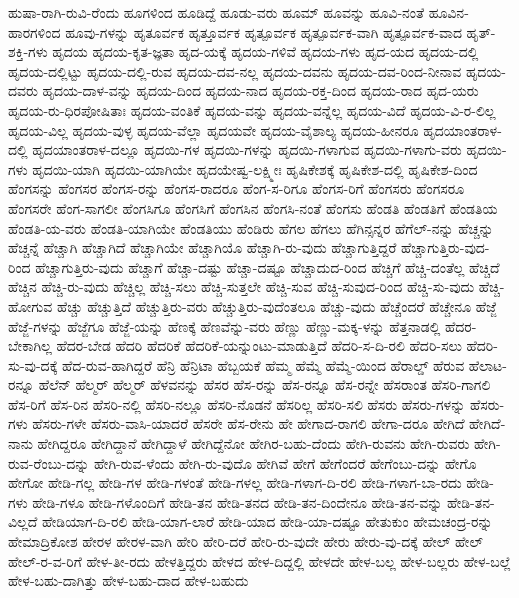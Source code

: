 {ಹುಷಾ-ರಾಗಿ-ರುವಿ-ರೆಂದು
ಹೂಗಳಿಂದ
ಹೂಡಿದ್ದೆ
ಹೂಡು-ವರು
ಹೂಮ್
ಹೂವನ್ನು
ಹೂವಿ-ನಂತೆ
ಹೂವಿನ-ಹಾರಗಳಿಂದ
ಹೂವು-ಗಳನ್ನು
ಹೃತೂರ್ವಕ
ಹೃತ್ತೂರ್ವಕ
ಹೃತ್ಪೂರ್ವಕ
ಹೃತ್ಪೂರ್ವಕ-ವಾಗಿ
ಹೃತ್ಪೂರ್ವಕ-ವಾದ
ಹೃತ್-ಶಕ್ತಿ-ಗಳು
ಹೃದಯ
ಹೃದಯ-ಕೃತ-ಜ್ಞತಾ
ಹೃದ-ಯಕ್ಕೆ
ಹೃದಯ-ಗಳಿವೆ
ಹೃದಯ-ಗಳು
ಹೃದ-ಯದ
ಹೃದಯ-ದಲ್ಲಿ
ಹೃದಯ-ದಲ್ಲಿಟ್ಟು
ಹೃದಯ-ದಲ್ಲಿ-ರುವ
ಹೃದಯ-ದವ-ನಲ್ಲ
ಹೃದಯ-ದವನು
ಹೃದಯ-ದವ-ರಿಂದ-ನೀನಾವ
ಹೃದಯ-ದವರು
ಹೃದಯ-ದಾಳ-ವನ್ನು
ಹೃದಯ-ದಿಂದ
ಹೃದಯ-ನಾದ
ಹೃದಯ-ರಕ್ತ-ದಿಂದ
ಹೃದಯ-ರಾದ
ಹೃದ-ಯರು
ಹೃದಯ-ರು-ಧಿರಪೋಷಿತಾಃ
ಹೃದಯ-ವಂತಿಕೆ
ಹೃದಯ-ವನ್ನು
ಹೃದಯ-ವನ್ನೆಲ್ಲ
ಹೃದಯ-ವಿದೆ
ಹೃದಯ-ವಿ-ರ-ಲಿಲ್ಲ
ಹೃದಯ-ವಿಲ್ಲ
ಹೃದಯ-ವುಳ್ಳ
ಹೃದಯ-ವೆಲ್ಲಾ
ಹೃದಯವೇ
ಹೃದಯ-ವೈಶಾಲ್ಯ
ಹೃದಯ-ಹೀನರೂ
ಹೃದಯಾಂತರಾಳ-ದಲ್ಲಿ
ಹೃದಯಾಂತರಾಳ-ದಲ್ಲೂ
ಹೃದಯಿ-ಗಳ
ಹೃದಯಿ-ಗಳನ್ನು
ಹೃದಯಿ-ಗಳಾಗುವ
ಹೃದಯಿ-ಗಳಾಗು-ವರು
ಹೃದಯಿ-ಗಳು
ಹೃದಯಿ-ಯಾಗಿ
ಹೃದಯಿ-ಯಾಗಿಯೇ
ಹೃದಯೇಷ್ವ-ಲಕ್ಷ್ಮೀಃ
ಹೃಷಿಕೇಶಕ್ಕೆ
ಹೃಷಿಕೇಶ-ದಲ್ಲಿ
ಹೃಷಿಕೇಶ-ದಿಂದ
ಹೆಂಗಸನ್ನು
ಹೆಂಗಸರ
ಹೆಂಗಸ-ರನ್ನು
ಹೆಂಗಸ-ರಾದರೂ
ಹೆಂಗ-ಸ-ರಿಗೂ
ಹೆಂಗಸ-ರಿಗೆ
ಹೆಂಗಸರು
ಹೆಂಗಸರೂ
ಹೆಂಗಸರೇ
ಹೆಂಗ-ಸಾಗಲೀ
ಹೆಂಗಸಿಗೂ
ಹೆಂಗಸಿಗೆ
ಹೆಂಗಸಿನ
ಹೆಂಗಸಿ-ನಂತೆ
ಹೆಂಗಸು
ಹೆಂಡತಿ
ಹೆಂಡತಿಗೆ
ಹೆಂಡತಿಯ
ಹೆಂಡತಿ-ಯ-ವರು
ಹೆಂಡತಿ-ಯಾಗಿಯೇ
ಹೆಂಡತಿಯು
ಹೆಂಡಿರು
ಹೆಗಲ
ಹೆಗಲು
ಹೆಗಿನ್ಸನ್ನರ
ಹೆಗೆಲ್-ನನ್ನು
ಹೆಚ್ಚನ್ನು
ಹೆಚ್ಚನ್ನೆ
ಹೆಚ್ಚಾಗಿ
ಹೆಚ್ಚಾಗಿದೆ
ಹೆಚ್ಚಾಗಿಯೇ
ಹೆಚ್ಚಾಗಿಯೊ
ಹೆಚ್ಚಾಗಿ-ರು-ವುದು
ಹೆಚ್ಚಾಗುತ್ತಿದ್ದರೆ
ಹೆಚ್ಚಾಗುತ್ತಿರು-ವುದ-ರಿಂದ
ಹೆಚ್ಚಾಗುತ್ತಿರು-ವುದು
ಹೆಚ್ಚಾಗೆ
ಹೆಚ್ಚಾ-ದಷ್ಟು
ಹೆಚ್ಚಾ-ದಷ್ಟೂ
ಹೆಚ್ಚಾದುದ-ರಿಂದ
ಹೆಚ್ಚಿಗೆ
ಹೆಚ್ಚಿ-ದಂತೆಲ್ಲ
ಹೆಚ್ಚಿದೆ
ಹೆಚ್ಚಿನ
ಹೆಚ್ಚಿ-ರು-ವುದು
ಹೆಚ್ಚಿಲ್ಲ
ಹೆಚ್ಚಿ-ಸಲು
ಹೆಚ್ಚಿ-ಸುತ್ತಲೇ
ಹೆಚ್ಚಿ-ಸುವ
ಹೆಚ್ಚಿ-ಸುವುದ-ರಿಂದ
ಹೆಚ್ಚಿ-ಸು-ವುದು
ಹೆಚ್ಚಿ-ಹೋಗುವ
ಹೆಚ್ಚು
ಹೆಚ್ಚುತ್ತಿದೆ
ಹೆಚ್ಚುತ್ತಿರು-ವರು
ಹೆಚ್ಚುತ್ತಿರು-ವುದೆಂತಲೂ
ಹೆಚ್ಚು-ವುದು
ಹೆಚ್ಚೆಂದರೆ
ಹೆಚ್ಚೇನೂ
ಹೆಜ್ಜೆ
ಹೆಜ್ಜೆ-ಗಳನ್ನು
ಹೆಜ್ಜೆಗೂ
ಹೆಜ್ಜೆ-ಯನ್ನು
ಹೆಣಕ್ಕೆ
ಹೆಣವೆನ್ನು-ವರು
ಹೆಣ್ಣು
ಹೆಣ್ಣು-ಮಕ್ಕ-ಳನ್ನು
ಹೆತ್ತನಾಡಲ್ಲಿ
ಹೆದರ-ಬೇಕಾಗಿಲ್ಲ
ಹೆದರ-ಬೇಡ
ಹೆದರಿ
ಹೆದರಿಕೆ
ಹೆದರಿಕೆ-ಯನ್ನುಂಟು-ಮಾಡುತ್ತಿದೆ
ಹೆದರಿ-ಸ-ದಿ-ರಲಿ
ಹೆದರಿ-ಸಲು
ಹೆದರಿ-ಸು-ವು-ದಕ್ಕೆ
ಹೆದ-ರುವ-ಹಾಗಿದ್ದರೆ
ಹೆನ್ರಿ
ಹೆನ್ರಿಟಾ
ಹೆಬ್ಬಯಕೆ
ಹೆಮ್ಮ
ಹೆಮ್ಮೆ
ಹೆಮ್ಮೆ-ಯಿಂದ
ಹೆರಾಲ್ಡ್
ಹೆರುವ
ಹೆಲಾಟ-ರನ್ನೂ
ಹೆಲೆನ್
ಹೆಲ್ಮರ್
ಹೆಲ್ಮರ್
ಹೆಳವನನ್ನು
ಹೆಸರ
ಹೆಸ-ರನ್ನು
ಹೆಸ-ರನ್ನೂ
ಹೆಸ-ರನ್ನೇ
ಹೆಸರಾಂತ
ಹೆಸರಿ-ಗಾಗಲಿ
ಹೆಸ-ರಿಗೆ
ಹೆಸ-ರಿನ
ಹೆಸರಿ-ನಲ್ಲಿ
ಹೆಸರಿ-ನಲ್ಲೂ
ಹೆಸರಿ-ನೊಡನೆ
ಹೆಸರಿಲ್ಲ
ಹೆಸರಿ-ಸಲಿ
ಹೆಸರು
ಹೆಸರು-ಗಳನ್ನು
ಹೆಸರು-ಗಳು
ಹೆಸರು-ಗಳೇ
ಹೆಸರು-ವಾಸಿ-ಯಾದರೆ
ಹೆಸರೇ
ಹೆಸ-ರೇನು
ಹೇ
ಹೇಗಾದ-ರಾಗಲಿ
ಹೇಗಾ-ದರೂ
ಹೇಗಿದೆ
ಹೇಗಿದೆ-ನಾನು
ಹೇಗಿದ್ದರೂ
ಹೇಗಿದ್ದಾನೆ
ಹೇಗಿದ್ದಾಳೆ
ಹೇಗಿದ್ದೆನೋ
ಹೇಗಿರ-ಬಹು-ದೆಂದು
ಹೇಗಿ-ರುವನು
ಹೇಗಿ-ರುವರು
ಹೇಗಿ-ರುವ-ರೆಂಬು-ದನ್ನು
ಹೇಗಿ-ರುವ-ಳೆಂದು
ಹೇಗಿ-ರು-ವುದೊ
ಹೇಗಿವೆ
ಹೇಗೆ
ಹೇಗೆಂದರೆ
ಹೇಗೆಂಬು-ದನ್ನು
ಹೇಗೊ
ಹೇಗೋ
ಹೇಡಿ-ಗಲ್ಲ
ಹೇಡಿ-ಗಳ
ಹೇಡಿ-ಗಳಂತೆ
ಹೇಡಿ-ಗಳಲ್ಲ
ಹೇಡಿ-ಗಳಾಗ-ದಿ-ರಲಿ
ಹೇಡಿ-ಗಳಾಗ-ಬಾ-ರದು
ಹೇಡಿ-ಗಳು
ಹೇಡಿ-ಗಳೂ
ಹೇಡಿ-ಗಳೊಂದಿಗೆ
ಹೇಡಿ-ತನ
ಹೇಡಿ-ತನದ
ಹೇಡಿ-ತನ-ದಿಂದೇನೂ
ಹೇಡಿ-ತನ-ವನ್ನು
ಹೇಡಿ-ತನ-ವಿಲ್ಲದೆ
ಹೇಡಿಯಾಗ-ದಿ-ರಲಿ
ಹೇಡಿ-ಯಾಗ-ಲಾರೆ
ಹೇಡಿ-ಯಾದ
ಹೇಡಿ-ಯಾ-ದಷ್ಟೂ
ಹೇತುಕುಂ
ಹೇಮಚಂದ್ರ-ರನ್ನು
ಹೇಮಾದ್ರಿಕೋಶ
ಹೇರಳ
ಹೇರಳ-ವಾಗಿ
ಹೇರಿ
ಹೇರಿ-ದರೆ
ಹೇರಿ-ರು-ವುದೇ
ಹೇರು
ಹೇರು-ವು-ದಕ್ಕೆ
ಹೇಲ್
ಹೇಲ್
ಹೇಲ್-ರ-ವ-ರಿಗೆ
ಹೇಳ-ತೀ-ರದು
ಹೇಳತ್ತಿದ್ದರು
ಹೇಳದ
ಹೇಳ-ದಿದ್ದಲ್ಲಿ
ಹೇಳದೇ
ಹೇಳ-ಬಲ್ಲ
ಹೇಳ-ಬಲ್ಲರು
ಹೇಳ-ಬಲ್ಲೆ
ಹೇಳ-ಬಹು-ದಾಗಿತ್ತು
ಹೇಳ-ಬಹು-ದಾದ
ಹೇಳ-ಬಹುದು
}
